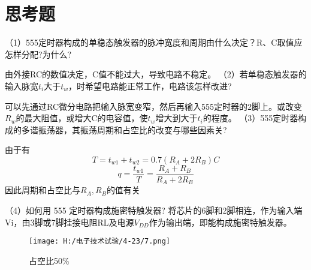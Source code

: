 \documentclass{article}
\begin{document}
\section{思考题}
（1）555定时器构成的单稳态触发器的脉冲宽度和周期由什么决定？R、C取值应怎样分配?为什么?\par
由外接RC的数值决定，C值不能过大，导致电路不稳定。
（2）若单稳态触发器的输入脉宽$t_i$大于$t_w$，时希望电路能正常工作，电路该怎样改进?\par 
可以先通过RC微分电路把输入脉宽变窄，然后再输入555定时器的2脚上。或改变$R_w$的最大阻值，或增大C的电容值，使$t_w$增大到大于$t_i$的程度。
（3）555定时器构成的多谐振荡器，其振荡周期和占空比的改变与哪些因素关?\par 
由于有
\[T=t_{w1}+t_{w2}=0.7(R_A+2R_B)C\]
\[q=\frac{t_{w1}}{T}=\frac{R_A+R_B}{R_A+2R_B}\]
因此周期和占空比与$R_A,R_B$的值有关\par 
（4）如何用 555 定时器构成施密特触发器?
将芯片的6脚和2脚相连，作为输入端Vi，由3脚或7脚挂接电阻RL及电源$V_{DD}$作为输出端，即能构成施密特触发器。
\begin{figure}[h]
  \centering   
  \texttt{[image: H:/电子技术试验/4-23/7.png]}   
  \caption{占空比50\%}   
  \label{fig:side:a}   
\end{figure}
\end{document}
